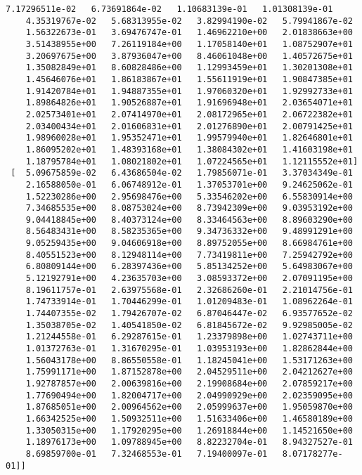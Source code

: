 \documentclass{article}
\begin{document}
\begin{Verbatim}[commandchars=\\\{\}]
    7.17296511e-02   6.73691864e-02   1.10683139e-01   1.01308139e-01
    4.35319767e-02   5.68313955e-02   3.82994190e-02   5.79941867e-02
    1.56322673e-01   3.69476747e-01   1.46962210e+00   2.01838663e+00
    3.51438955e+00   7.26119184e+00   1.17058140e+01   1.08752907e+01
    3.20697675e+00   3.87936047e+00   8.46061048e+00   1.40572675e+01
    1.35082849e+01   8.60828486e+00   1.12993459e+01   1.30201308e+01
    1.45646076e+01   1.86183867e+01   1.55611919e+01   1.90847385e+01
    1.91420784e+01   1.94887355e+01   1.97060320e+01   1.92992733e+01
    1.89864826e+01   1.90526887e+01   1.91696948e+01   2.03654071e+01
    2.02573401e+01   2.07414970e+01   2.08172965e+01   2.06722382e+01
    2.03400434e+01   2.01606831e+01   2.01276890e+01   2.00791425e+01
    1.98960028e+01   1.95352471e+01   1.99579940e+01   1.82646801e+01
    1.86095202e+01   1.48393168e+01   1.38084302e+01   1.41603198e+01
    1.18795784e+01   1.08021802e+01   1.07224565e+01   1.12115552e+01]
 [  5.09675859e-02   6.43686504e-02   1.79856071e-01   3.37034349e-01
    2.16588050e-01   6.06748912e-01   1.37053701e+00   9.24625062e-01
    1.52230286e+00   2.95698476e+00   5.33546202e+00   6.55830914e+00
    7.34685535e+00   8.08753024e+00   8.73942309e+00   9.03953192e+00
    9.04418845e+00   8.40373124e+00   8.33464563e+00   8.89603290e+00
    8.56483431e+00   8.58235365e+00   9.34736332e+00   9.48991291e+00
    9.05259435e+00   9.04606918e+00   8.89752055e+00   8.66984761e+00
    8.40551523e+00   8.12948114e+00   7.73419811e+00   7.25942792e+00
    6.80809144e+00   6.28397436e+00   5.85134252e+00   5.64983067e+00
    5.12192791e+00   4.23635703e+00   3.08593372e+00   2.07091195e+00
    8.19611757e-01   2.63975568e-01   2.32686260e-01   2.21014756e-01
    1.74733914e-01   1.70446299e-01   1.01209483e-01   1.08962264e-01
    1.74407355e-02   1.79426707e-02   6.87046447e-02   6.93577652e-02
    1.35038705e-02   1.40541850e-02   6.81845672e-02   9.92985005e-02
    1.21244558e-01   6.29287615e-01   1.23379898e+00   1.02743711e+00
    1.01372763e-01   1.31670295e-01   1.03953193e+00   1.82862844e+00
    1.56043178e+00   8.86550558e-01   1.18245041e+00   1.53171263e+00
    1.75991171e+00   1.87152878e+00   2.04529511e+00   2.04212627e+00
    1.92787857e+00   2.00639816e+00   2.19908684e+00   2.07859217e+00
    1.77690494e+00   1.82004717e+00   2.04990929e+00   2.02359095e+00
    1.87685051e+00   2.00964562e+00   2.05999637e+00   1.95059870e+00
    1.66342525e+00   1.50932511e+00   1.51633406e+00   1.46580189e+00
    1.33050315e+00   1.17920295e+00   1.26918844e+00   1.14521650e+00
    1.18976173e+00   1.09788945e+00   8.82232704e-01   8.94327527e-01
    8.69859700e-01   7.32468553e-01   7.19400097e-01   8.07178277e-01]]
    \end{Verbatim}
\end{document}
